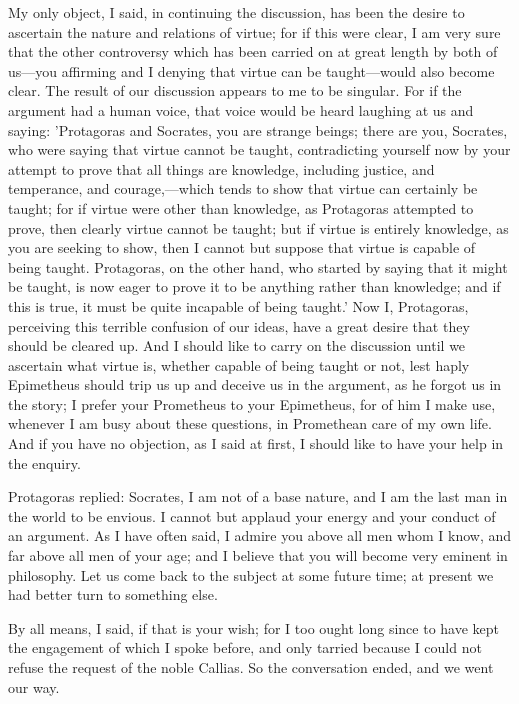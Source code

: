 \documentclass[11pt,letter]{article}
\begin{document}
\par  My only object, I said, in continuing the discussion, has been the desire to ascertain the nature and relations of virtue; for if this were clear, I am very sure that the other controversy which has been carried on at great length by both of us—you affirming and I denying that virtue can be taught—would also become clear. The result of our discussion appears to me to be singular. For if the argument had a human voice, that voice would be heard laughing at us and saying: 'Protagoras and Socrates, you are strange beings; there are you, Socrates, who were saying that virtue cannot be taught, contradicting yourself now by your attempt to prove that all things are knowledge, including justice, and temperance, and courage,—which tends to show that virtue can certainly be taught; for if virtue were other than knowledge, as Protagoras attempted to prove, then clearly virtue cannot be taught; but if virtue is entirely knowledge, as you are seeking to show, then I cannot but suppose that virtue is capable of being taught. Protagoras, on the other hand, who started by saying that it might be taught, is now eager to prove it to be anything rather than knowledge; and if this is true, it must be quite incapable of being taught.' Now I, Protagoras, perceiving this terrible confusion of our ideas, have a great desire that they should be cleared up. And I should like to carry on the discussion until we ascertain what virtue is, whether capable of being taught or not, lest haply Epimetheus should trip us up and deceive us in the argument, as he forgot us in the story; I prefer your Prometheus to your Epimetheus, for of him I make use, whenever I am busy about these questions, in Promethean care of my own life. And if you have no objection, as I said at first, I should like to have your help in the enquiry.

\par  Protagoras replied: Socrates, I am not of a base nature, and I am the last man in the world to be envious. I cannot but applaud your energy and your conduct of an argument. As I have often said, I admire you above all men whom I know, and far above all men of your age; and I believe that you will become very eminent in philosophy. Let us come back to the subject at some future time; at present we had better turn to something else.

\par  By all means, I said, if that is your wish; for I too ought long since to have kept the engagement of which I spoke before, and only tarried because I could not refuse the request of the noble Callias. So the conversation ended, and we went our way.

\par 
 
\end{document}

